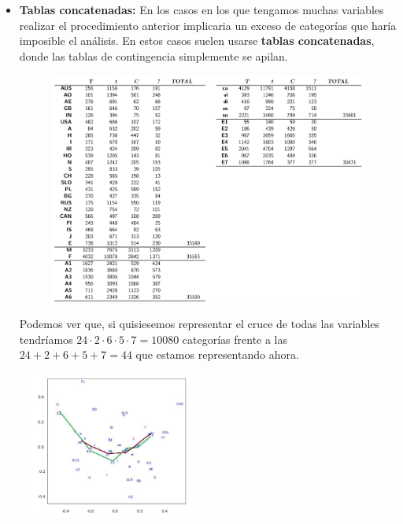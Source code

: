 \begin{itemize}
    \item \textbf{Tablas concatenadas:} En los casos en los que tengamos muchas variables realizar el procedimiento anterior implicaria un exceso de categorías que haría imposible el análisis. En estos casos suelen usarse \textbf{tablas concatenadas}, donde las tablas de contingencia simplemente se apilan.
    \begin{figure}[h]
        \includegraphics[width=\textwidth]{assets/tablas_apiladas.png}
    \end{figure}
    
    Podemos ver que, si quisiesemos representar el cruce de todas las variables tendríamos $24\cdot2\cdot6\cdot5\cdot7=10080$ categorías frente a las $24+2+6+5+7=44$ que estamos representando ahora.
\end{itemize}

\begin{figure}
    \centering
    \includegraphics[width=0.5\textwidth]{assets/resultados_concatenadas.png}
\end{figure}

